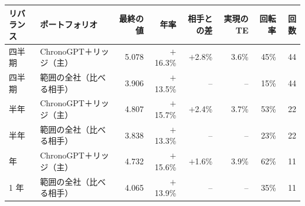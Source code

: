 \begin{tabular}{@{}llrrrrrr@{}}
\toprule
リバランス & ポートフォリオ & 最終の値 & 年率 & 相手との差 & 実現の TE & 回転率 & 回数 \\
\midrule
四半期 & ChronoGPT＋リッジ（主） & 5.078 & $+$16.3\% & $+$2.8\% & 3.6\% & 45\% & 44 \\
四半期 & 範囲の全社（比べる相手） & 3.906 & $+$13.5\% & -- & -- & 15\% & 44 \\
\addlinespace
半年 & ChronoGPT＋リッジ（主） & 4.807 & $+$15.7\% & $+$2.4\% & 3.7\% & 53\% & 22 \\
半年 & 範囲の全社（比べる相手） & 3.838 & $+$13.3\% & -- & -- & 23\% & 22 \\
\addlinespace
1 年 & ChronoGPT＋リッジ（主） & 4.732 & $+$15.6\% & $+$1.6\% & 3.9\% & 62\% & 11 \\
1 年 & 範囲の全社（比べる相手） & 4.065 & $+$13.9\% & -- & -- & 35\% & 11 \\
\bottomrule
\end{tabular}

